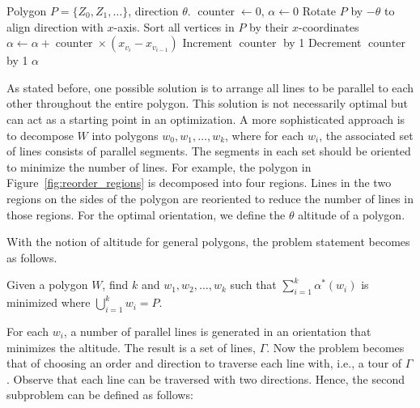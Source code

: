 \documentclass[../main.tex]{subfiles}
\begin{document}
\begin{algorithm}
	\caption{$\operatorname{get\_general\_altitude}(P, \theta)$}
	\label{alg:altitude}
	\begin{algorithmic}[1]
		\REQUIRE Polygon $P=\{Z_0, Z_1,\ldots\}$, direction $\theta$.
			\STATE $\operatorname{counter}\gets 0$, $\alpha\gets 0$
			\STATE Rotate $P$ by $-\theta$ to align direction with $x$-axis.
			\STATE Sort all vertices in $P$ by their  $x$-coordinates
				\STATE $\alpha\gets \alpha+\operatorname{counter}\times(x_{v_{i}}-x_{v_{i-1}})$ 
					\STATE Increment $\operatorname{counter}$ by 1
					\STATE Decrement $\operatorname{counter}$ by 1
				\ENDIF
			\ENDFOR
			\RETURN $\alpha$
	\end{algorithmic}
\end{algorithm}


As stated before, one possible solution is to arrange all lines to be parallel to each other throughout the entire polygon. This solution is not necessarily optimal but can act as a starting point in an optimization. A more sophisticated approach is to decompose $W$ into polygons $w_0,w_1,\ldots,w_k$, where for each $w_i$, the associated set of lines consists of parallel segments. The segments in each set should be oriented to minimize the number of lines. For example, the polygon in Figure~\ref{fig:reorder_regions} is decomposed into four regions. Lines in the two regions on the sides of the polygon are reoriented to reduce the number of lines in those regions. For the optimal orientation, we define the $\theta$ altitude of a polygon.

With the notion of altitude for general polygons, the problem statement becomes as follows.
\begin{problem}
\label{prob:min_alt_decomp}
Given a polygon $W$, find $k$ and $w_1,w_2,\ldots,w_k$ such that $\sum^k_{i=1}\alpha^*(w_i)$ is minimized where $\bigcup^k_{i=1}w_i=P$.
\end{problem}

For each $w_i$, a number of parallel lines is generated in an orientation that minimizes the altitude. The result is a set of lines, $\Gamma$. Now the problem becomes that of choosing an order and direction to traverse each line with, i.e., a tour of $\Gamma$. Observe that each line can be traversed with two directions. Hence, the second subproblem can be defined as follows:
\end{document}
